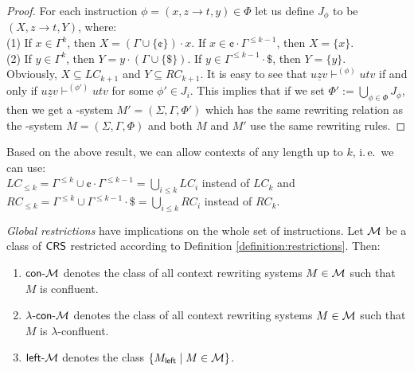 \begin{proof}
For each instruction $\phi = (x, z \to t, y) \in \Phi$ let us define $J_{\phi}$ to be $(X, z \to t, Y)$, where:\\
(1) \quad If $x \in \Gamma^k$, then $X = (\Gamma \cup \{ \cent \}) \cdot x$. If $x \in \cent \cdot \Gamma^{\le k-1}$, then $X = \{ x \}$.\\
(2) \quad If $y \in \Gamma^k$, then $Y = y \cdot (\Gamma \cup \{ \$ \})$. If $y \in \Gamma^{\le k-1}\cdot\$ $, then $Y = \{ y \}$.\\
Obviously, $X \subseteq LC_{k+1}$ and $Y \subseteq RC_{k+1}$.
It is easy to see that $u \underline{z} v \vdash^{(\phi)} utv$ if and only if $u \underline{z} v \vdash^{(\phi')} utv$ for some $\phi' \in J_i$. This implies that if we set $\Phi' := \bigcup_{\phi \in \Phi}{J_{\phi}}$, then we get a \kCRS[(k+1)]-system $M'=(\Sigma, \Gamma, \Phi')$ which has the same rewriting relation as the \kCRS[k]-system $M=(\Sigma, \Gamma, \Phi)$ and both $M$ and $M'$ use the same rewriting rules.
\end{proof}

\begin{remark}
Based on the above result, we can allow contexts of any length up to $k$, i.\,e.\ we can use:\\
\indent {}$LC_{\le k} = \Gamma^{\le k} \cup \cent \cdot \Gamma^{\le k-1} = \bigcup_{i \le k} LC_i$ instead of $LC_k$ and\\
\indent {}$RC_{\le k} = \Gamma^{\le k} \cup \Gamma^{\le k-1} \cdot \$ = \bigcup_{i \le k} RC_i$ instead of $RC_k$.
\end{remark}

\begin{definition}\label{definition:restrictions-global}
\emph{Global restrictions} have implications on the whole set of instructions. Let $\textup{\sf $\mathcal{M}$}$ be a class of $\textup{\sf CRS\/}$ restricted according to Definition \ref{definition:restrictions}. Then:
\begin{enumerate}
\item\label{restriction:conf}
$\textup{\sf con-\textup{\sf $\mathcal{M}$}}$ denotes the class of all context rewriting systems $M \in \textup{\sf $\mathcal{M}$}$ such that $M$ is confluent.

\item\label{restriction:lambda}
$\textup{\sf $\lambda$-con-\textup{\sf $\mathcal{M}$}}$ denotes the class of all context rewriting systems $M \in \textup{\sf $\mathcal{M}$}$ such that $M$ is $\lambda$-confluent.

\item\label{restriction:left}
$\textup{\sf left-\textup{\sf $\mathcal{M}$}}$ denotes the class $\{M_{\sf left} \mid M \in \textup{\sf $\mathcal{M}$}\}$.
\end{enumerate}
\end{definition}

